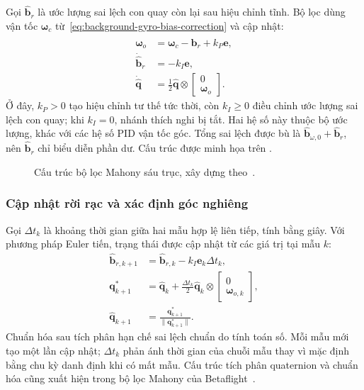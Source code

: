 Gọi $\hat{\mathbf b}_r$ là ước lượng sai lệch con quay còn lại sau hiệu chỉnh tĩnh. Bộ lọc dùng vận tốc $\symbf\omega_c$ từ~\eqref{eq:background-gyro-bias-correction} và cập nhật:
\begin{equation}
    \begin{aligned}
        \symbf\omega_o&=\symbf\omega_c-\hat{\mathbf b}_r+k_P\mathbf e,\\
        \dot{\hat{\mathbf b}}_r&=-k_I\mathbf e,\\
        \dot{\hat{\mathbf q}}&=\frac12\hat{\mathbf q}\otimes
            \begin{bmatrix}0\\\symbf\omega_o\end{bmatrix}.
    \end{aligned}
    \label{eq:background-mahony-observer}
\end{equation}
Ở đây, $k_P>0$ tạo hiệu chỉnh tư thế tức thời, còn $k_I\geq0$ điều chỉnh ước lượng sai lệch con quay; khi $k_I=0$, nhánh thích nghi bị tắt. Hai hệ số này thuộc bộ ước lượng, khác với các hệ số PID vận tốc góc. Tổng sai lệch được bù là $\widehat{\mathbf b}_{\omega,0}+\hat{\mathbf b}_r$, nên $\hat{\mathbf b}_r$ chỉ biểu diễn phần dư. Cấu trúc được minh họa trên .

\begin{figure}[htbp]
    \centering
    \resizebox{\linewidth}{!}{}
    \caption{Cấu trúc bộ lọc Mahony sáu trục, xây dựng theo~\cite{hamel2006attitude,mahony2008nonlinear}.}
    \label{fig:background-mahony-filter}
\end{figure}

\subsubsection{Cập nhật rời rạc và xác định góc nghiêng}

Gọi $\Delta t_k$ là khoảng thời gian giữa hai mẫu hợp lệ liên tiếp, tính bằng giây. Với phương pháp Euler tiến, trạng thái được cập nhật từ các giá trị tại mẫu $k$:
\begin{equation}
    \begin{aligned}
        \hat{\mathbf b}_{r,k+1}
            &=\hat{\mathbf b}_{r,k}-k_I\mathbf e_k\Delta t_k,\\
        \mathbf q^*_{k+1}
            &=\hat{\mathbf q}_k+\frac{\Delta t_k}{2}\hat{\mathbf q}_k
                \otimes\begin{bmatrix}0\\\symbf\omega_{o,k}\end{bmatrix},\\
        \hat{\mathbf q}_{k+1}
            &=\frac{\mathbf q^*_{k+1}}{\|\mathbf q^*_{k+1}\|}.
    \end{aligned}
    \label{eq:background-mahony-discrete}
\end{equation}
Chuẩn hóa sau tích phân hạn chế sai lệch chuẩn do tính toán số. Mỗi mẫu mới tạo một lần cập nhật; $\Delta t_k$ phản ánh thời gian của chuỗi mẫu thay vì mặc định bằng chu kỳ danh định khi có mất mẫu. Cấu trúc tích phân quaternion và chuẩn hóa cũng xuất hiện trong bộ lọc Mahony của Betaflight~\cite{betaflight452Mahony}.

